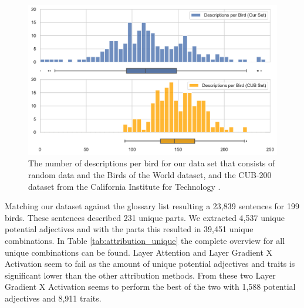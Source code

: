 \documentclass[a4paper, 12pt, oneside]{book} %
\begin{document}
\begin{figure}[h!]
 \centering
 \includegraphics[width=\textwidth]{figures/CUB_distribution.pdf}
 \caption[Bird description distribution]{The number of descriptions per bird for our data set that consists of random data and the Birds of the World dataset, and the CUB-200 dataset from the California Institute for Technology \autocite{welinder_caltech-ucsd_2010}. }
 \label{fig:CUB_distribution}
\end{figure}


Matching our dataset against the glossary list resulting a 23,839 sentences for 199 birds. 
These sentences described 231 unique parts. 
We extracted 4,537 unique potential adjectives and with the parts this resulted in 39,451 unique combinations.
In Table \ref{tab:attribution_unique} the complete overview for all unique combinations can be found.
Layer Attention and Layer Gradient X Activation seem to fail as the amount of unique potential adjectives and traits is significant lower than the other attribution methods.
From these two Layer Gradient X Activation seems to perform the best of the two with 1,588 potential adjectives and 8,911 traits.
\end{document}
